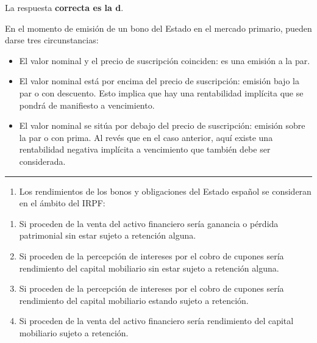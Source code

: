 \documentclass[
  letterpaper,
  DIV=11,
  numbers=noendperiod]{scrreprt}
\providecommand{\tightlist}{%
  \setlength{\itemsep}{0pt}\setlength{\parskip}{0pt}}\usepackage{longtable,booktabs,array}
\begin{document}
\begin{tcolorbox}
\begin{tcolorbox}[enhanced jigsaw, toprule=.15mm, left=2mm, arc=.35mm, breakable, bottomrule=.15mm, opacityback=0, rightrule=.15mm, leftrule=.75mm, colframe=quarto-callout-note-color-frame, colback=white]
\begin{minipage}[t]{\textwidth - 5.5mm}
La respuesta \textbf{correcta es la d}.

En el momento de emisión de un bono del Estado en el mercado primario,
pueden darse tres circunstancias:

\begin{itemize}
\item
  El valor nominal y el precio de suscripción coinciden: es una emisión
  a la par.
\item
  El valor nominal está por encima del precio de suscripción: emisión
  bajo la par o con descuento. Esto implica que hay una rentabilidad
  implícita que se pondrá de manifiesto a vencimiento.
\item
  El valor nominal se sitúa por debajo del precio de suscripción:
  emisión sobre la par o con prima. Al revés que en el caso anterior,
  aquí existe una rentabilidad negativa implícita a vencimiento que
  también debe ser considerada.
\end{itemize}

\end{minipage}%
\end{tcolorbox}

\begin{center}\rule{0.5\linewidth}{0.5pt}\end{center}

\begin{enumerate}
\def\labelenumi{\arabic{enumi}.}
\setcounter{enumi}{12}
\tightlist
\item
  Los rendimientos de los bonos y obligaciones del Estado español se
  consideran en el ámbito del IRPF:
\end{enumerate}

\begin{enumerate}
\def\labelenumi{\alph{enumi}.}
\item
  Si proceden de la venta del activo financiero sería ganancia o pérdida
  patrimonial sin estar sujeto a retención alguna.
\item
  Si proceden de la percepción de intereses por el cobro de cupones
  sería rendimiento del capital mobiliario sin estar sujeto a retención
  alguna.
\item
  Si proceden de la percepción de intereses por el cobro de cupones
  sería rendimiento del capital mobiliario estando sujeto a retención.
\item
  Si proceden de la venta del activo financiero sería rendimiento del
  capital mobiliario sujeto a retención.
\end{enumerate}


\end{tcolorbox}
\end{document}
